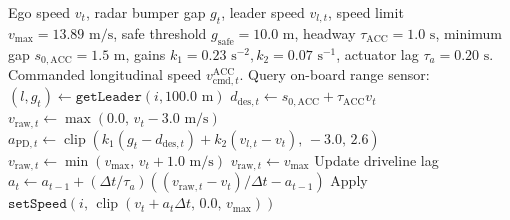 \begin{algorithm}[htbp]
\caption{On-Board Radar/LiDAR Adaptive Cruise Control (ACC) with Actuator Lag}
\label{alg:acc}
\begin{algorithmic}[1]
\Require Ego speed $v_t$, radar bumper gap $g_t$, leader speed $v_{l,t}$, speed limit $v_{\max} = 13.89\text{ m/s}$, safe threshold $g_{\text{safe}} = 10.0\text{ m}$, headway $\tau_{\text{ACC}} = 1.0\text{ s}$, minimum gap $s_{0,\text{ACC}} = 1.5\text{ m}$, gains $k_1 = 0.23\text{ s}^{-2}, k_2 = 0.07\text{ s}^{-1}$, actuator lag $\tau_a = 0.20\text{ s}$.
\Ensure Commanded longitudinal speed $v_{\text{cmd},t}^{\text{ACC}}$.
    \State Query on-board range sensor: $(l, g_t) \gets \texttt{getLeader}(i, 100.0\text{ m})$
        \State $d_{\text{des},t} \gets s_{0,\text{ACC}} + \tau_{\text{ACC}} v_t$
            \State $v_{\text{raw},t} \gets \max(0.0, \, v_t - 3.0\text{ m/s})$
        \Else
            \State $a_{\text{PD},t} \gets \operatorname{clip}\left(k_1(g_t - d_{\text{des},t}) + k_2(v_{l,t} - v_t), \, -3.0, \, 2.6\right)$
            \State $v_{\text{raw},t} \gets \min(v_{\max}, \, v_t + 1.0\text{ m/s})$
        \EndIf
    \Else
        \State $v_{\text{raw},t} \gets v_{\max}$
    \EndIf
    \State Update driveline lag $a_t \gets a_{t-1} + (\Delta t / \tau_a)((v_{\text{raw},t} - v_t)/\Delta t - a_{t-1})$
    \State Apply $\texttt{setSpeed}(i, \, \operatorname{clip}(v_t + a_t \Delta t, \, 0.0, \, v_{\max}))$
\EndFor
\end{algorithmic}
\end{algorithm}
